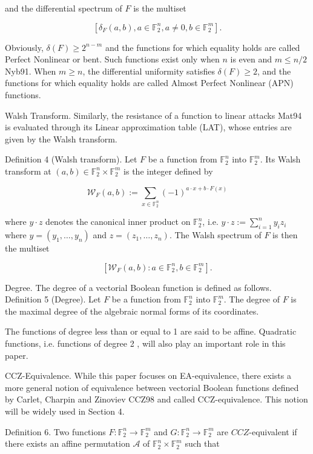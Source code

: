 \documentclass[10pt]{article}
\begin{document}
and the differential spectrum of $F$ is the multiset

$$
\left[\delta_{F}(a, b), a \in \mathbb{F}_{2}^{n}, a \neq 0, b \in \mathbb{F}_{2}^{m}\right] .
$$

Obviously, $\delta(F) \geqslant 2^{n-m}$ and the functions for which equality holds are called Perfect Nonlinear or bent. Such functions exist only when $n$ is even and $m \leqslant n / 2$ Nyb91. When $m \geqslant n$, the differential uniformity satisfies $\delta(F) \geqslant 2$, and the functions for which equality holds are called Almost Perfect Nonlinear (APN) functions.

Walsh Transform. Similarly, the resistance of a function to linear attacks Mat94 is evaluated through its Linear approximation table (LAT), whose entries are given by the Walsh transform.

Definition 4 (Walsh transform). Let $F$ be a function from $\mathbb{F}_{2}^{n}$ into $\mathbb{F}_{2}^{m}$. Its Walsh transform at $(a, b) \in \mathbb{F}_{2}^{n} \times \mathbb{F}_{2}^{m}$ is the integer defined by

$$
\mathcal{W}_{F}(a, b):=\sum_{x \in \mathbb{F}_{2}^{n}}(-1)^{a \cdot x+b \cdot F(x)}
$$

where $y \cdot z$ denotes the canonical inner product on $\mathbb{F}_{2}^{n}$, i.e. $y \cdot z:=\sum_{i=1}^{n} y_{i} z_{i}$ where $y=\left(y_{1}, \ldots, y_{n}\right)$ and $z=\left(z_{1}, \ldots, z_{n}\right)$. The Walsh spectrum of $F$ is then the multiset

$$
\left[\mathcal{W}_{F}(a, b): a \in \mathbb{F}_{2}^{n}, b \in \mathbb{F}_{2}^{m}\right] .
$$

Degree. The degree of a vectorial Boolean function is defined as follows.\\
Definition 5 (Degree). Let $F$ be a function from $\mathbb{F}_{2}^{n}$ into $\mathbb{F}_{2}^{m}$. The degree of $F$ is the maximal degree of the algebraic normal forms of its coordinates.

The functions of degree less than or equal to 1 are said to be affine. Quadratic functions, i.e. functions of degree 2 , will also play an important role in this paper.

CCZ-Equivalence. While this paper focuses on EA-equivalence, there exists a more general notion of equivalence between vectorial Boolean functions defined by Carlet, Charpin and Zinoviev CCZ98 and called CCZ-equivalence. This notion will be widely used in Section 4.

Definition 6. Two functions $F: \mathbb{F}_{2}^{n} \rightarrow \mathbb{F}_{2}^{m}$ and $G: \mathbb{F}_{2}^{n} \rightarrow \mathbb{F}_{2}^{m}$ are $C C Z$-equivalent if there exists an affine permutation $\mathcal{A}$ of $\mathbb{F}_{2}^{n} \times \mathbb{F}_{2}^{m}$ such that
\end{document}
